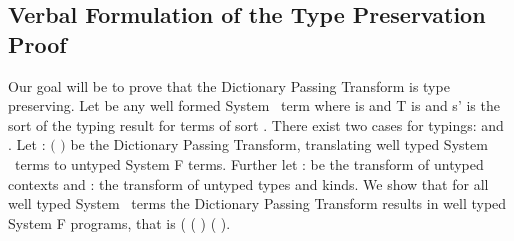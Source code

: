 \subsection{Verbal Formulation of the  Type Preservation Proof}
Our goal will be to prove that the Dictionary Passing Transform is type preserving. Let  be any well formed System \Fo\ term    \Constr{:}  where  is   and T is   and s' is the sort of the typing result for terms of sort . There exist two cases for typings:    \Constr{:}  and    \Constr{:} . Let  : $($   \Constr{:} $)$    be the Dictionary Passing Transform, translating well typed System \Fo\ terms to untyped System F terms. Further let  :    be the transform of untyped contexts and  :      the transform of untyped types and kinds. We show that for all well typed System \Fo\  terms  the Dictionary Passing Transform results in well typed System F programs, that is (   ( ) \Constr{:} ( ).